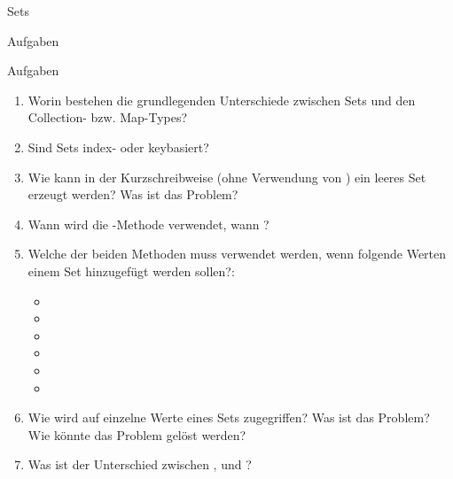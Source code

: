 \begin{subsection}{Sets}
        
        \begin{subsubsection}{Aufgaben}
            \begin{frame}{Aufgaben}
                \begin{enumerate}
                    \item Worin bestehen die grundlegenden Unterschiede zwischen Sets und den Collection- bzw. Map-Types?
                    \item Sind Sets index- oder keybasiert?
                    \item Wie kann in der Kurzschreibweise (ohne Verwendung von ) ein leeres Set erzeugt werden? Was ist das Problem?
                    \item Wann wird die -Methode verwendet, wann ?
                    \item Welche der beiden Methoden muss verwendet werden, wenn folgende Werten einem Set hinzugefügt werden sollen?:
                    \begin{itemize}
                        \item {}
                        \item \code{[1,2]}
                        \item {}
                        \item {}
                        \item {}
                        \item {}
                    \end{itemize}
                    
                    \item Wie wird auf einzelne Werte eines Sets zugegriffen? Was ist das Problem? Wie könnte das Problem gelöst werden?
                    
                    \item Was ist der Unterschied zwischen ,  und ?
                \end{enumerate}
            \end{frame}
        \end{subsubsection}
    \end{subsection}
        
    